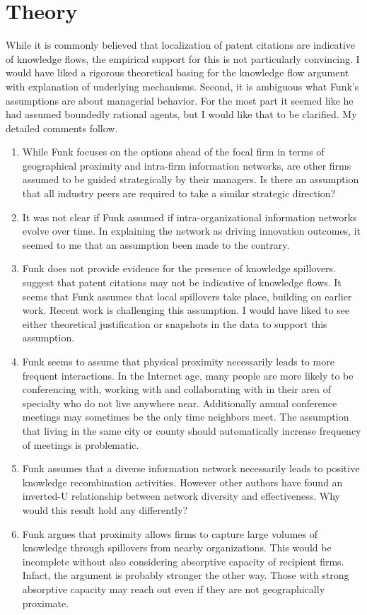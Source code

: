 \documentclass[12pt,letterpaper]{article}
\begin{document}
\section{Theory}
While it is commonly believed that localization of patent citations are indicative of knowledge flows, the empirical support for this is not particularly convincing. I would have liked a rigorous theoretical basing for the knowledge flow argument with explanation of underlying mechanisms. Second, it is ambiguous what Funk's assumptions are about managerial behavior. For the most part it seemed like he had assumed boundedly rational agents, but I would like that to be clarified. My detailed comments follow.
\begin{enumerate}
  \item While Funk focuses on the options ahead of the focal firm in terms of geographical proximity and intra-firm information networks, are other firms assumed to be guided strategically by their managers. Is there an assumption that all industry peers are required to take a similar strategic direction?
  \item It was not clear if Funk assumed if intra-organizational information networks evolve over time. In explaining the network as driving innovation outcomes, it seemed to me that an assumption been made to the contrary.
  \item Funk does not provide evidence for the presence of knowledge spillovers. \cite{Arora2017a} suggest that patent citations may not be indicative of knowledge flows. It seems that Funk assumes that local spillovers take place, building on earlier work. Recent work is challenging this assumption. I would have liked to see either theoretical justification or snapshots in the data to support this assumption.
  \item Funk seems to assume that physical proximity necessarily leads to more frequent interactions. In the Internet age, many people are more likely to be conferencing with, working with and collaborating with in their area of specialty who do not live anywhere near. Additionally annual conference meetings may sometimes be the only time neighbors meet. The assumption that living in the same city or county should automatically increase frequency of meetings is problematic. 
  \item Funk assumes that a diverse information network necessarily leads to positive knowledge recombination activities. However other authors have found an inverted-U relationship between network diversity and effectiveness. Why would this result hold any differently?
   \item Funk argues that proximity allows firms to capture large volumes of knowledge through spillovers from nearby organizations. This would be incomplete without also considering absorptive capacity of recipient firms. Infact, the argument is probably stronger the other way. Those with strong absorptive capacity may reach out even if they are not geographically proximate.
\end{enumerate}
\end{document}
